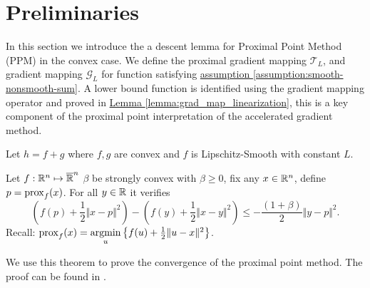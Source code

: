 \documentclass[12pt]{article}
\begin{document}
    

    
\section{Preliminaries}\label{sec:preliminaries}
    In this section we introduce the a descent lemma for Proximal Point Method (PPM) in the convex case. 
    We define the proximal gradient mapping $\mathcal T_L$, and gradient mapping $\mathcal G_L$ for function satisfying 
    \hyperref[assumption:smooth-nonsmooth-sum]
    {assumption \ref*{assumption:smooth-nonsmooth-sum}}. 
    A lower bound function is identified using the gradient mapping operator and proved in
    \hyperref[lemma:grad_map_linearization]{Lemma \ref*{lemma:grad_map_linearization}}, 
    this is a key component of the proximal point interpretation of the accelerated gradient method. 
    \begin{assumption}\label{assumption:smooth-nonsmooth-sum}
        Let $h = f + g$ where $f, g$ are convex and $f$ is Lipschitz-Smooth with constant $L$. 
    \end{assumption}
    \begin{definition}
    \end{definition}

    \begin{theorem}\label{thm:ppm_descent_ineq}
        Let $f: \mathbb R^n \mapsto \overline {\mathbb R}^n$ $\beta$ be strongly convex with $\beta \ge 0$, fix any $x \in \mathbb R^n$, define $p = \operatorname{prox}_f(x)$.
        For all $y \in \mathbb R$ it verifies
        $$
            \left(f(p) + \frac{1}{2}\Vert x - p\Vert^2\right)
            - 
            \left(
                f(y) + \frac{1}{2}\Vert x - y\Vert^2 
            \right)
            \le 
            - \frac{(1 + \beta)}{2}\Vert y - p\Vert^2. 
        $$
        Recall: $\operatorname{prox}_f(x) = \mathop{\rm argmin}\limits_{u}\left\lbrace f(u) + \frac{1}{2}\Vert u - x\Vert^2 \right\rbrace$. 
    \end{theorem}
    \begin{remark}
        We use this theorem to prove the convergence of the proximal point method. 
        The proof can be found in \cite[theorem 12.26]{bauschke_convex_2017}. 
    \end{remark}
 
\end{document}
